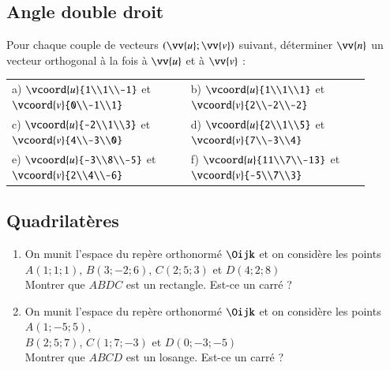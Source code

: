 \documentclass[oneside,12pt]{article}          %
\begin{document}
\subsection{Angle double droit}
Pour chaque couple de vecteurs $(\vv{u};\vv{v})$ suivant, déterminer $\vv{n}$ un vecteur orthogonal à la fois à $\vv{u}$ et à $\vv{v}$ :

\begin{tabular}{p{0.45\linewidth}p{0.45\linewidth}}
	a) $\vcoord{u}{1\\1\\-1}$ et $\vcoord{v}{0\\-1\\1}$ & b) $\vcoord{u}{1\\1\\1}$ et $\vcoord{v}{2\\-2\\-2}$ \\[15pt]
	c) $\vcoord{u}{-2\\1\\3}$ et $\vcoord{v}{4\\-3\\0}$ & d) $\vcoord{u}{2\\1\\5}$ et $\vcoord{v}{7\\-3\\4}$ \\[15pt]
	e) $\vcoord{u}{-3\\8\\-5}$ et $\vcoord{v}{2\\4\\-6}$ & f) $\vcoord{u}{11\\7\\-13}$ et $\vcoord{v}{-5\\7\\3}$
\end{tabular}



\subsection{Quadrilatères}
\begin{enumerate}
	\item On munit l'espace du repère orthonormé $\Oijk$ et on considère les points $A(1;1;1)$, $B(3;-2;6)$, $C(2;5;3)$ et $D(4;2;8)$\\
	Montrer que $ABDC$ est un rectangle. Est-ce un carré ?
	\item On munit l'espace du repère orthonormé $\Oijk$ et on considère les points $A(1;-5;5)$, \\$B(2;5;7)$, $C(1;7;-3)$ et $D(0;-3;-5)$\\
	Montrer que $ABCD$ est un losange. Est-ce un carré ?
\end{enumerate}
\end{document}
